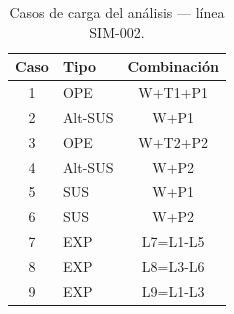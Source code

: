\begin{table}[htbp]
  \centering
  \small
  \caption{Casos de carga del análisis — línea SIM-002.}
  \label{tab:casos}
  \begin{tabular}{clc}
    \toprule
    Caso & Tipo & Combinaci\'on \\
    \midrule
    1 & OPE & W+T1+P1 \\
    2 & Alt-SUS & W+P1 \\
    3 & OPE & W+T2+P2 \\
    4 & Alt-SUS & W+P2 \\
    5 & SUS & W+P1 \\
    6 & SUS & W+P2 \\
    7 & EXP & L7=L1-L5 \\
    8 & EXP & L8=L3-L6 \\
    9 & EXP & L9=L1-L3 \\
    \bottomrule
  \end{tabular}
\end{table}
